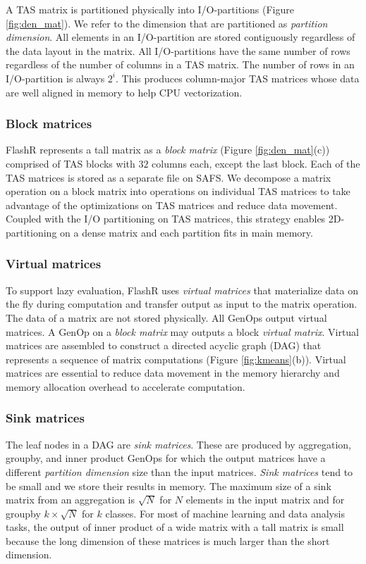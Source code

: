 A TAS matrix is partitioned physically into I/O-partitions (Figure
\ref{fig:den_mat}). We refer to the dimension that are partitioned as
\textit{partition dimension}. All elements in an I/O-partition are stored
contiguously regardless of the data layout in the matrix. All 
I/O-partitions have the same number of rows regardless of
the number of columns in a TAS matrix. The number of rows in
an I/O-partition is always $2^i$. This produces column-major TAS
matrices whose data are well aligned in memory to help CPU vectorization.

\subsubsection{Block matrices} \label{sec:block_mat}
FlashR represents a tall matrix as a \textit{block matrix} 
(Figure \ref{fig:den_mat}(c)) comprised of TAS blocks with $32$ columns each,
except the last block. 
Each of the TAS matrices is stored as a separate file on SAFS. 
We decompose a matrix operation
on a block matrix into operations on individual TAS matrices to take advantage
of the optimizations on TAS matrices and reduce data movement.
Coupled with the I/O partitioning on TAS matrices, this strategy enables
2D-partitioning on a dense matrix and each partition fits in main memory.


\subsubsection{Virtual matrices} \label{virt_mat}
To support lazy evaluation, FlashR uses \textit{virtual matrices} that
materialize data on the fly during computation and transfer output as input to
the matrix operation. The data of a matrix are not stored physically.
All GenOps output virtual matrices. A GenOp on a \textit{block matrix} may outputs
a block \textit{virtual matrix}. Virtual matrices are assembled to construct
a directed acyclic graph (DAG) that represents a sequence of matrix computations
(Figure \ref{fig:kmeans}(b)). Virtual matrices are essential to reduce data
movement in the memory hierarchy and memory allocation overhead to accelerate
computation.

\subsubsection{Sink matrices}
The leaf nodes in a DAG are \textit{sink matrices}.
These are produced by aggregation, groupby, and inner product GenOps for which 
the output matrices have a different \textit{partition dimension} size than
the input matrices. \textit{Sink matrices} tend to be small and we store their
results in memory. The maximum size of a sink matrix from an aggregation
is $\sqrt{N}$ for $N$ elements in the input matrix and for groupby
$k \times \sqrt{N}$ for $k$ classes. For most of machine learning and data
analysis tasks, the output of inner product of a wide matrix with a tall matrix
is small because
the long dimension of these matrices is much larger than the short dimension.

